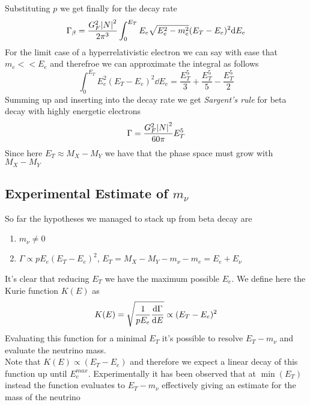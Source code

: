 \documentclass[../qm.tex]{subfiles}
\begin{document}
Substituting $p$ we get finally for the decay rate
\begin{equation*}
	\Gamma_\beta=\frac{G_F^2\abs{N}^2}{2\pi^3}\int_{0}^{E_T}E_e\sqrt{E_e^2-m_e^2}(E_T-E_e)^2\dd E_e
\end{equation*}
For the limit case of a hyperrelativistic electron we can say with ease that $m_e<<E_e$ and therefroe we can approximate the integral as follows
\begin{equation*}
	\int_{0}^{E_T}E_e^2(E_T-E_e)^2\dd E_e=\frac{E_T^5}{3}+\frac{E_T^5}{5}-\frac{E_T^5}{2}
\end{equation*}
Summing up and inserting into the decay rate we get \emph{Sargent's rule} for beta decay with highly energetic electrons
\begin{equation}
	\Gamma=\frac{G_F^2\abs{N}^2}{60\pi}E^5_T
	\label{eq:sargentrule}
\end{equation}
Since here $E_T\approx M_X-M_Y$ we have that the phase space must grow with $M_X-M_Y$
\subsection{Experimental Estimate of $m_\nu$}
So far the hypotheses we managed to stack up from beta decay are
\begin{enumerate}
\item $m_\nu\ne0$
\item $\Gamma\propto pE_e(E_T-E_e)^2$, $E_T=M_X-M_Y-m_\nu-m_e=E_e+E_\nu$
\end{enumerate}
It's clear that reducing $E_T$ we have the maximum possible $E_e$. We define here the Kurie function $K(E)$ as
\begin{equation*}
	K(E)=\sqrt{\frac{1}{pE_e}\dv{\Gamma}{E}}\propto(E_T-E_e)^2
\end{equation*}
Evaluating this function for a minimal $E_T$ it's possible to resolve $E_T-m_\nu$ and evaluate the neutrino mass.\\
Note that $K(E)\propto(E_T-E_e)$ and therefore we expect a linear decay of this function up until $E_e^{max}$. Experimentally it has been observed that at $\min(E_T)$ instead the function evaluates to $E_T-m_\nu$ effectively giving an estimate for the mass of the neutrino
\end{document}
